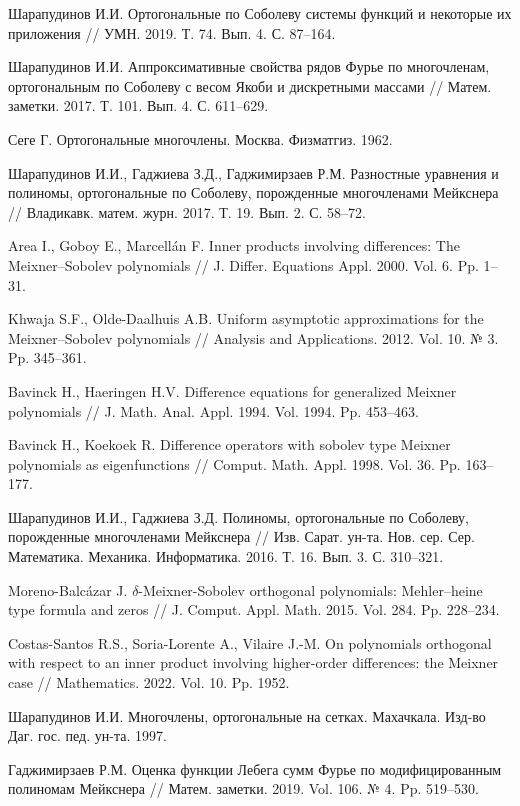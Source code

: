 \begin{thebibliography}{111}
{Шарапудинов И.И.} Ортогональные по Соболеву системы функций и некоторые их приложения // УМН. 2019. Т. 74. Вып. 4. С. 87--164.

{Шарапудинов И.И.} Аппроксимативные свойства рядов Фурье по многочленам, ортогональным по Соболеву с весом Якоби и дискретными массами // Матем. заметки. 2017. Т. 101. Вып. 4. С. 611--629.	
	
{Сеге Г.} Ортогональные многочлены. Москва. Физматгиз. 1962.	

{Шарапудинов И.И., Гаджиева З.Д., Гаджимирзаев Р.М.} Разностные уравнения и полиномы, ортогональные по Соболеву, порожденные многочленами Мейкснера //  Владикавк. матем. журн. 2017. Т. 19. Вып. 2. С. 58--72.

{Area I., Goboy E., Marcell\'an F.} Inner products involving differences: The Meixner–Sobolev polynomials // J. Differ. Equations Appl. 2000. Vol. 6. Pp. 1--31.

{Khwaja S.F., Olde-Daalhuis A.B.} Uniform asymptotic approximations for the Meixner–Sobolev polynomials // Analysis and Applications. 2012. Vol. 10. № 3. Pp. 345--361.

{Bavinck H., Haeringen H.V.} Difference equations for generalized Meixner polynomials // J. Math. Anal. Appl. 1994. Vol. 1994. Pp. 453--463.

{Bavinck H., Koekoek R.} Difference operators with sobolev type Meixner polynomials as eigenfunctions // Comput. Math. Appl. 1998. Vol. 36. Pp. 163--177.

{Шарапудинов И.И., Гаджиева З.Д.} Полиномы, ортогональные по Соболеву, порожденные многочленами Мейкснера // Изв. Сарат. ун-та. Нов. сер. Сер. Математика. Механика. Информатика. 2016. Т. 16. Вып. 3. С. 310--321.

{Moreno-Balc\'azar J.} $\delta$-Meixner-Sobolev orthogonal polynomials: Mehler–heine type formula and zeros // J. Comput. Appl. Math. 2015. Vol. 284. Pp. 228--234.

{Costas-Santos R.S., Soria-Lorente A., Vilaire J.-M.} On polynomials orthogonal with respect to an inner product involving higher-order differences: the Meixner case // Mathematics. 2022. Vol. 10. Pp. 1952.

{Шарапудинов И.И.} Многочлены, ортогональные на сетках. Махачкала. Изд-во Даг. гос. пед. ун-та. 1997.

{Гаджимирзаев Р.М.} Оценка функции Лебега сумм Фурье по модифицированным полиномам Мейкснера // Матем. заметки. 2019. Vol. 106. № 4. Pp. 519--530.

\end{thebibliography} 